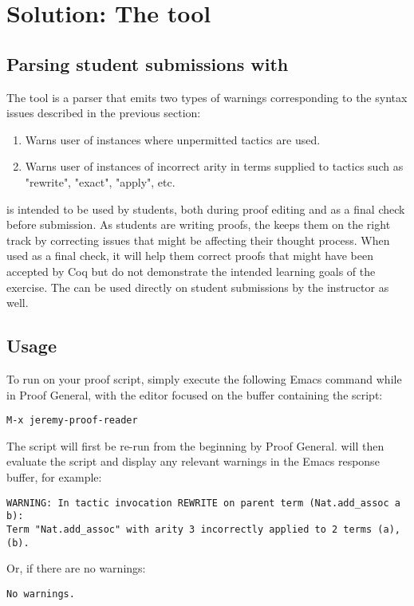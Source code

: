 
\chapter{Solution: The  tool} %

\label{solution} %

\section{Parsing student submissions with }
The  tool is a parser that emits two types of warnings corresponding to the syntax issues described in the previous section:

\begin{enumerate}
    \item Warns user of instances where unpermitted tactics are used.
    \item Warns user of instances of incorrect arity in terms supplied to tactics such as "rewrite", "exact", "apply", etc.
\end{enumerate}

 is intended to be used by students, both during proof editing and as a final check before submission. As students are writing proofs, the   keeps them on the right track by correcting issues that might be affecting their thought process. When used as a final check, it will help them correct proofs that might have been accepted by Coq but do not demonstrate the intended learning goals of the exercise. The  can be used directly on student submissions by the instructor as well.


\section{Usage}
To run  on your proof script, simply execute the following Emacs command while in Proof General, with the editor focused on the buffer containing the script:
\begin{verbatim}
M-x jeremy-proof-reader
\end{verbatim}
The script will first be re-run from the beginning by Proof General.  will then evaluate the script and display any relevant warnings in the Emacs response buffer, for example:
\begin{verbatim}
WARNING: In tactic invocation REWRITE on parent term (Nat.add_assoc a b):
Term "Nat.add_assoc" with arity 3 incorrectly applied to 2 terms (a),(b).
\end{verbatim}
Or, if there are no warnings:
\begin{verbatim}
No warnings.
\end{verbatim}

